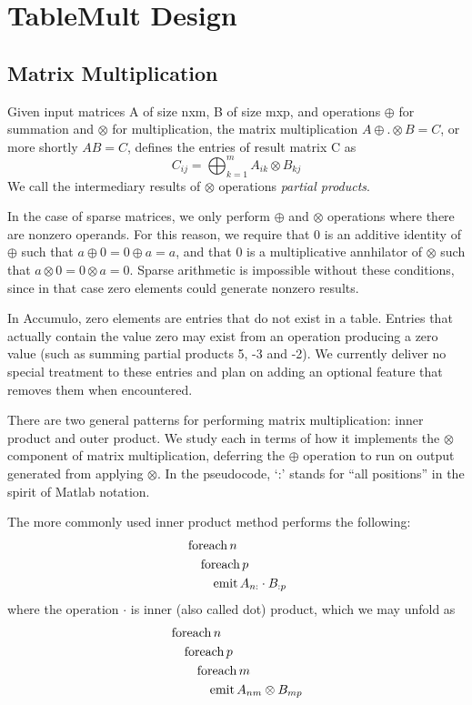 
\section{TableMult Design}
\label{sDesign}


\subsection{Matrix Multiplication}
Given input matrices A of size nxm, B of size mxp,
and operations $\oplus$ for summation and $\otimes$ for multiplication,
the matrix multiplication $A \oplus.\otimes B = C$, or more shortly $AB = C$,
defines the entries of result matrix C as 
\[ C_{ij} = \bigoplus_{k=1}^m A_{ik} \otimes B_{kj} \]
We call the intermediary results of $\otimes$ operations \emph{partial products}.

In the case of sparse matrices, we only perform $\oplus$ and $\otimes$ operations where there are nonzero operands.
For this reason, we require that 0 is an additive identity of $\oplus$ such that $a \oplus 0 = 0 \oplus a = a$,
and that 0 is a multiplicative annhilator of $\otimes$ such that $a \otimes 0 = 0 \otimes a = 0$.
Sparse arithmetic is impossible without these conditions, since in that case zero elements could generate nonzero results.

In Accumulo, zero elements are entries that do not exist in a table. Entries that actually contain the value zero may exist
from an operation producing a zero value (such as summing partial products 5, -3 and -2).  
We currently deliver no special treatment to these entries and plan on adding
an optional feature that removes them when encountered.

There are two general patterns for performing matrix multiplication: inner product and outer product.
We study each in terms of how it implements the $\otimes$ component of matrix multiplication,
deferring the $\oplus$ operation to run on output generated from applying $\otimes$.
In the pseudocode, `:' stands for ``all positions'' in the spirit of Matlab notation.

The more commonly used inner product method performs the following:
\begin{align*}
&\operatorname{foreach} n \\
&\quad\operatorname{foreach} p \\
&\quad\quad\operatorname{emit} A_{n:} \cdot B_{:p} 
\end{align*}
where the operation $\cdot$ is inner (also called dot) product, which we may unfold as
\begin{align*}
&\operatorname{foreach} n \\
&\quad\operatorname{foreach} p \\
&\quad\quad\operatorname{foreach} m \\
&\quad\quad\quad\operatorname{emit} A_{nm} \otimes B_{mp} 
\end{align*}

